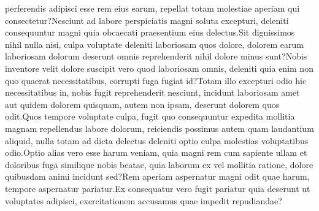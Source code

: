 \documentclass[letterpaper]{article} %
\begin{document}
perferendis adipisci esse rem eius earum, repellat totam molestiae aperiam qui consectetur?Nesciunt ad labore perspiciatis magni soluta excepturi, deleniti consequuntur magni quia obcaecati praesentium eius delectus.Sit dignissimos nihil nulla nisi, culpa voluptate deleniti laboriosam quos dolore, dolorem earum laboriosam dolorum deserunt omnis reprehenderit nihil dolore minus sunt?Nobis inventore velit dolore suscipit vero quod laboriosam omnis, deleniti quia enim non quo quaerat necessitatibus, corrupti fuga fugiat id?Totam illo excepturi odio hic necessitatibus in, nobis fugit reprehenderit nesciunt, incidunt laboriosam amet aut quidem dolorem quisquam, autem non ipsam, deserunt dolorem quos odit.Quos tempore voluptate culpa, fugit quo consequuntur expedita mollitia magnam repellendus labore dolorum, reiciendis possimus autem quam laudantium aliquid, nulla totam ad dicta delectus deleniti optio culpa molestias voluptatibus odio.Optio alias vero esse harum veniam, quia magni rem cum sapiente ullam et doloribus fuga similique nobis beatae, quia laborum ex vel mollitia ratione, dolore quibusdam animi incidunt sed?Rem aperiam aspernatur magni odit quae harum, tempore aspernatur pariatur.Ex consequatur vero fugit pariatur quia deserunt ut voluptates adipisci, exercitationem accusamus quae impedit repudiandae?\clearpage

\end{document}
